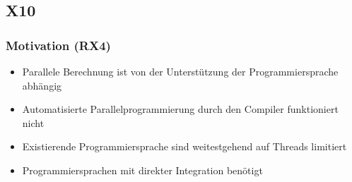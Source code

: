 \subsection{X10}

\subsubsection{Motivation (RX4)}
\begin{itemize}
	\item Parallele Berechnung ist von der Unterstützung der Programmiersprache abhängig
	\item Automatisierte Parallelprogrammierung durch den Compiler funktioniert nicht
	\item Existierende Programmiersprache sind weitestgehend auf Threads limitiert
	\item Programmiersprachen mit direkter Integration benötigt
\end{itemize}

